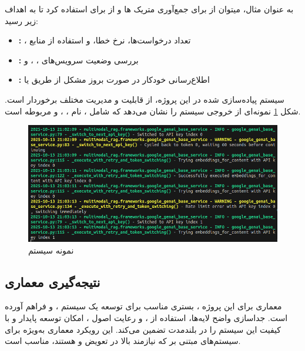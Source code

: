 \noindent
به عنوان مثال، میتوان از  برای جمع‌آوری متریک ها و از  برای  استفاده کرد تا به اهداف زیر رسید:

\begin{itemize}
    \item \textbf{:} ، تعداد درخواست‌ها، نرخ خطا، و استفاده از منابع
    \item \textbf{:} بررسی وضعیت سرویس‌های ، ، و 
    \item \textbf{:} اطلاع‌رسانی خودکار در صورت بروز مشکل از طریق  یا 
\end{itemize}

\noindent
سیستم  پیاده‌سازی شده در این پروژه، از قابلیت  و مدیریت  مختلف برخوردار است. شکل \ref{fig:logging_example} نمونه‌ای از خروجی سیستم  را نشان می‌دهد که شامل ، نام ، ، و  مربوطه است.

\begin{figure}[h]
    \centering
    \includegraphics[width=\textwidth]{logging_example.png}
    \caption{نمونه  سیستم }
    \label{fig:logging_example}
\end{figure}

\subsection{نتیجه‌گیری معماری}

معماری  برای این پروژه ، بستری مناسب برای توسعه یک سیستم ،  و  فراهم آورده است. جداسازی واضح لایه‌ها، استفاده از ، و رعایت اصول ، امکان توسعه پایدار و با کیفیت این سیستم را در بلندمدت تضمین می‌کند. این رویکرد معماری به‌ویژه برای سیستم‌های مبتنی بر  که نیازمند  بالا در تعویض  و  هستند، مناسب است.
